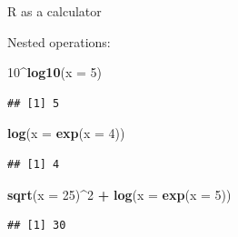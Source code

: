 \documentclass[ignorenonframetext,]{beamer}
\newenvironment{Shaded}{\begin{snugshade}}{\end{snugshade}}
\newcommand{\DataTypeTok}[1]{\textcolor[rgb]{0.13,0.29,0.53}{#1}}
\newcommand{\DecValTok}[1]{\textcolor[rgb]{0.00,0.00,0.81}{#1}}
\newcommand{\KeywordTok}[1]{\textcolor[rgb]{0.13,0.29,0.53}{\textbf{#1}}}
\newcommand{\NormalTok}[1]{#1}
\newcommand{\OperatorTok}[1]{\textcolor[rgb]{0.81,0.36,0.00}{\textbf{#1}}}
\newcommand{\StringTok}[1]{\textcolor[rgb]{0.31,0.60,0.02}{#1}}
\begin{document}
\begin{frame}[fragile]{R as a calculator}
\protect\hypertarget{r-as-a-calculator-4}{}

Nested operations:

\begin{Shaded}
\begin{Highlighting}[]
\DecValTok{10}\OperatorTok{^}\KeywordTok{log10}\NormalTok{(}\DataTypeTok{x =} \DecValTok{5}\NormalTok{)}
\end{Highlighting}
\end{Shaded}

\begin{verbatim}
## [1] 5
\end{verbatim}

\begin{Shaded}
\begin{Highlighting}[]
\KeywordTok{log}\NormalTok{(}\DataTypeTok{x =} \KeywordTok{exp}\NormalTok{(}\DataTypeTok{x =} \DecValTok{4}\NormalTok{))}
\end{Highlighting}
\end{Shaded}

\begin{verbatim}
## [1] 4
\end{verbatim}

\begin{Shaded}
\begin{Highlighting}[]
\KeywordTok{sqrt}\NormalTok{(}\DataTypeTok{x =} \DecValTok{25}\NormalTok{)}\OperatorTok{^}\DecValTok{2} \OperatorTok{+}\StringTok{ }\KeywordTok{log}\NormalTok{(}\DataTypeTok{x =} \KeywordTok{exp}\NormalTok{(}\DataTypeTok{x =} \DecValTok{5}\NormalTok{))}
\end{Highlighting}
\end{Shaded}

\begin{verbatim}
## [1] 30
\end{verbatim}

\end{frame}
\end{document}
